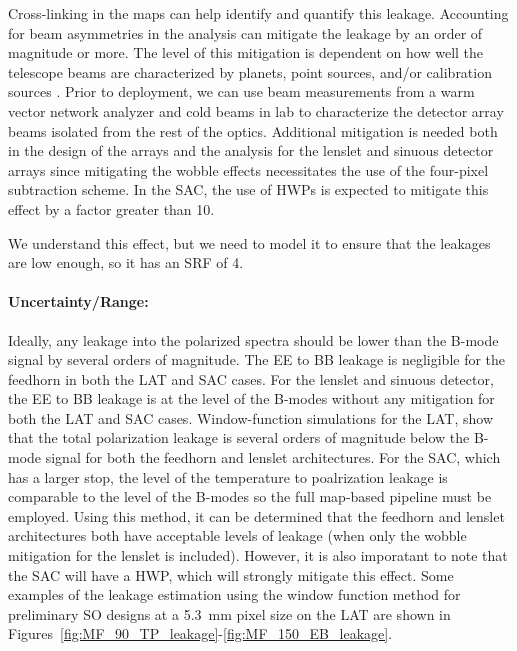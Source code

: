 Cross-linking in the maps can help identify and quantify this leakage. Accounting for beam asymmetries in the analysis can mitigate the leakage by an order of magnitude or more. The level of this mitigation is dependent on how well the telescope beams are characterized by planets, point sources, and/or calibration sources \cite{planck16i, weiland11, Planck2017_planet_flux}. Prior to deployment, we can use beam measurements from a warm vector network analyzer and cold beams in lab to characterize the detector array beams isolated from the rest of the optics. Additional mitigation is needed both in the design of the arrays and the analysis for the lenslet and sinuous detector arrays since mitigating the wobble effects necessitates the use of the four-pixel subtraction scheme. In the SAC, the use of HWPs is expected to mitigate this effect by a factor greater than 10.

We understand this effect, but we need to model it to ensure that the leakages are low enough, so it has an SRF of 4.

\paragraph{Uncertainty/Range:}
Ideally, any leakage into the polarized spectra should be lower than the B-mode signal by several orders of magnitude. The EE to BB leakage is negligible for the feedhorn in both the LAT and SAC cases. For the lenslet and sinuous detector, the EE to BB leakage is at the level of the B-modes without any mitigation for both the LAT and SAC cases. Window-function simulations for the LAT, show that the total polarization leakage is several orders of magnitude below the B-mode signal for both the feedhorn and lenslet architectures. For the SAC, which has a larger stop, the level of the temperature to poalrization leakage is comparable to the level of the B-modes so the full map-based pipeline must be employed. Using this method, it can be determined that the feedhorn and lenslet architectures both have acceptable levels of leakage (when only the wobble mitigation for the lenslet is included). However, it is also imporatant to note that the SAC will have a HWP, which will strongly mitigate this effect. Some examples of the leakage estimation using the window function method for preliminary SO designs at a 5.3~mm pixel size on the LAT are shown in Figures~\ref{fig:MF_90_TP_leakage}-\ref{fig:MF_150_EB_leakage}.

